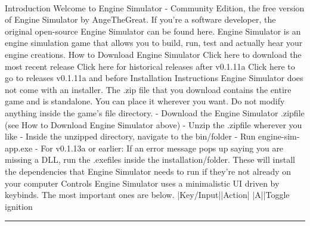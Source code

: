 \documentclass[10pt,a4paper]{article}
\begin{document}
\begin{multicols*}{2}
\paragraph{}

Introduction
Welcome to Engine Simulator - Community Edition, the free version of Engine Simulator by AngeTheGreat. If you're a software developer, the original open-source Engine Simulator can be found here.
Engine Simulator is an engine simulation game that allows you to build, run, test and actually hear your engine creations.
How to Download Engine Simulator
Click here to download the most recent release
Click here for historical releases after v0.1.11a
Click here to go to releases v0.1.11a and before
Installation Instructions
Engine Simulator does not come with an installer. The
.zip file that you download contains the entire game and is standalone. You can place it wherever you want. Do not modify anything inside the game's file directory.
- Download the Engine Simulator
.zipfile (see How to Download Engine Simulator above)
- Unzip the
.zipfile wherever you like
- Inside the unzipped directory, navigate to the
bin/folder
- Run
engine-sim-app.exe
- For v0.1.13a or earlier: If an error message pops up saying you are missing a DLL, run the
.exefiles inside the
installation/folder. These will install the dependencies that Engine Simulator needs to run if they're not already on your computer
Controls
Engine Simulator uses a minimalistic UI driven by keybinds. The most important ones are below.
|Key/Input||Action|
|A||Toggle ignition
\par\noindent\textcolor{red}{\rule{\linewidth}{0.2mm}}
\vfill
\null
\end{multicols*}

\newpage
\end{document}
